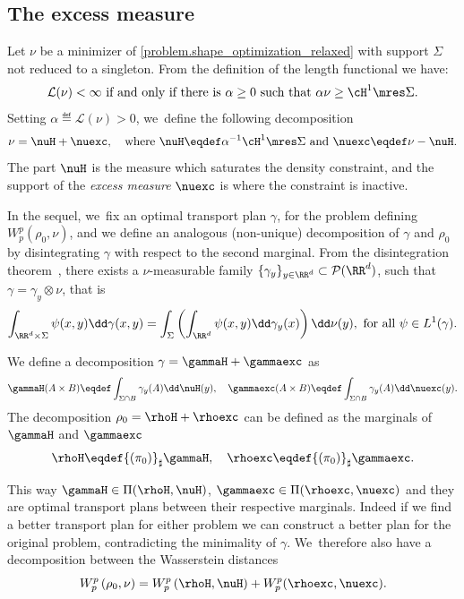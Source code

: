 \subsection{The excess measure}
Let $\nu$ be a minimizer of \eqref{problem.shape_optimization_relaxed} with support
$\Sigma$ not reduced to a singleton. From the definition of the length functional we have:
\[
\mathcal{L}(\nu) < \infty \text{ if and only if there is $\alpha \ge 0$ such that } \alpha\nu \ge \cH^1\mres \Sigma.
\]
Setting $\alpha \eqdef \mathcal{L}(\nu)>0$, we~define the following decomposition
\begin{equation}\label{nuexceed}
\nu = \nuH + \nuexc,\quad
\text{where $\nuH \eqdef \alpha^{-1}\cH^1\mres \Sigma$ and $\nuexc \eqdef \nu - \nuH$}.
\end{equation}
The part $\nuH$ is the measure which saturates the density constraint, and the support of the \emph{excess measure} $\nuexc$ is where the constraint is inactive.

In the sequel, we~fix an optimal transport plan $\gamma$, for the problem defining $W_p^p(\rho_0, \nu)$, and we define an analogous (non-unique) decomposition of $\gamma$ and $\rho_0$ by disintegrating $\gamma$ with respect to the second marginal. From the disintegration theorem~\cite[Th.\,2.28]{ambrosio2000functions}, there exists a $\nu$-measurable family $\{\gamma_{y}\}_{y\in \RR^d} \subset \mathcal{P}(\RR^d)$, such that $\gamma= \gamma_y\otimes\nu$, that is\vspace*{-3pt}
\begin{equation}\label{disintegration_formula}
\int_{\RR^d \times \Sigma}
\psi(x, y)\dd \gamma(x,y)
=
\int_\Sigma
\left(
\int_{\RR^d} \psi(x,y)\dd \gamma_y(x)
\right)\dd\nu(y), \text{ for all $\psi \in L^1(\gamma)$}.
\end{equation}

We define a decomposition $\gamma = \gammaH + \gammaexc$ as
\begin{equation}\label{gammaexceed}
\gammaH(A\times B)\eqdef
\int_{\Sigma \cap B}
\gamma_y(A)
\dd\nuH(y),
\quad
\gammaexc(A\times B)\eqdef
\int_{\Sigma \cap B}
\gamma_y(A)
\dd\nuexc(y).
\end{equation}
The decomposition $\rho_0 = \rhoH + \rhoexc$ can be defined as the marginals of $\gammaH$ and $\gammaexc$
\begin{equation}\label{rhoexceed}
\rhoH \eqdef {(\pi_{0})}_\sharp \gammaH,
\quad
\rhoexc \eqdef {(\pi_{0})}_\sharp \gammaexc.
\end{equation}

This way $\gammaH \in \Pi(\rhoH, \nuH)$, $\gammaexc \in \Pi(\rhoexc, \nuexc)$ and they are optimal transport plans between their respective marginals. Indeed if we find a better transport plan for either problem we can construct a better plan for the original problem, contradicting the minimality of $\gamma$. We~therefore also have a decomposition between the Wasserstein distances\vspace*{-3pt}
\begin{equation}\label{rhoexc_decomposition_wasserstein}
W_p^p\left(\rho_0, \nu\right)
=
W_p^p\left(\rhoH, \nuH\right)
+
W_p^p(\rhoexc, \nuexc).
\end{equation}

